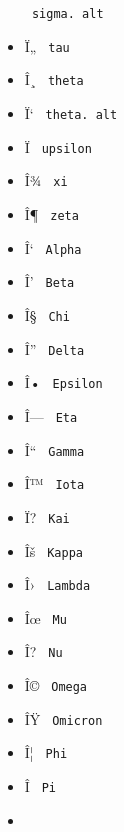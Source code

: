 \begin{itemize}
{  \texttt{\ sigma.\ alt\ }}
\item
  \label{symbol-tau}{{ Ï„ } \texttt{\ tau\ }}
\item
  \label{symbol-theta}{{ Î¸ } \texttt{\ theta\ }}
\item
  \label{symbol-theta.alt}{{ Ï` }
  \texttt{\ theta.\ alt\ }}
\item
  \label{symbol-upsilon}{{ Ï } \texttt{\ upsilon\ }}
\item
  \label{symbol-xi}{{ Î¾ } \texttt{\ xi\ }}
\item
  \label{symbol-zeta}{{ Î¶ } \texttt{\ zeta\ }}
\item
  \label{symbol-Alpha}{{ Î` } \texttt{\ Alpha\ }}
\item
  \label{symbol-Beta}{{ Î' } \texttt{\ Beta\ }}
\item
  \label{symbol-Chi}{{ Î§ } \texttt{\ Chi\ }}
\item
  \label{symbol-Delta}{{ Î'' } \texttt{\ Delta\ }}
\item
  \label{symbol-Epsilon}{{ Î• } \texttt{\ Epsilon\ }}
\item
  \label{symbol-Eta}{{ Î--- } \texttt{\ Eta\ }}
\item
  \label{symbol-Gamma}{{ Î`` } \texttt{\ Gamma\ }}
\item
  \label{symbol-Iota}{{ Î™ } \texttt{\ Iota\ }}
\item
  \label{symbol-Kai}{{ Ï? } \texttt{\ Kai\ }}
\item
  \label{symbol-Kappa}{{ Îš } \texttt{\ Kappa\ }}
\item
  \label{symbol-Lambda}{{ Î› } \texttt{\ Lambda\ }}
\item
  \label{symbol-Mu}{{ Îœ } \texttt{\ Mu\ }}
\item
  \label{symbol-Nu}{{ Î? } \texttt{\ Nu\ }}
\item
  \label{symbol-Omega}{{ Î© } \texttt{\ Omega\ }}
\item
  \label{symbol-Omicron}{{ ÎŸ } \texttt{\ Omicron\ }}
\item
  \label{symbol-Phi}{{ Î¦ } \texttt{\ Phi\ }}
\item
  \label{symbol-Pi}{{ Î } \texttt{\ Pi\ }}
\item

\end{itemize}
